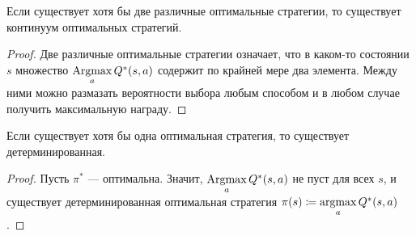 \begin{proposition}
Если существует хотя бы две различные оптимальные стратегии, то существует континуум оптимальных стратегий.
\begin{proof}
Две различные оптимальные стратегии означает, что в каком-то состоянии $s$ множество $\mathop{\mathrm{Argmax}}\limits_a Q^*(s, a)$ содержит по крайней мере два элемента. Между ними можно размазать вероятности выбора любым способом и в любом случае получить максимальную награду.
\end{proof}
\end{proposition}

\begin{proposition}\label{pr:deterministicoptimal}
Если существует хотя бы одна оптимальная стратегия, то существует детерминированная.
\begin{proof}
Пусть $\pi^*$ --- оптимальна. Значит, $\mathop{\mathrm{Argmax}}\limits_a Q^*(s, a)$ не пуст для всех $s$, и существует детерминированная оптимальная стратегия $\pi(s) \coloneqq \mathop{\mathrm{argmax}}\limits_a Q^*(s, a)$.
\end{proof}
\end{proposition}

